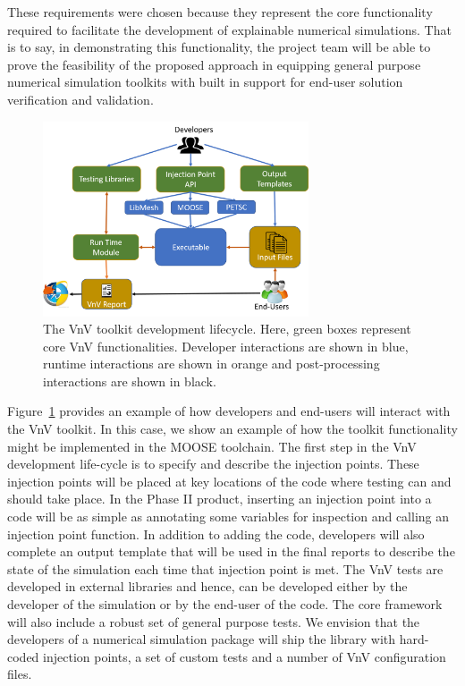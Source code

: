 These requirements were chosen because they represent the core functionality required to facilitate the development of explainable numerical simulations. That is to say, in demonstrating this functionality, the project team will be able to prove the feasibility of the proposed approach in equipping general purpose numerical simulation toolkits with built in support for end-user solution verification and validation. 
\begin{figure}
\centering
 \includegraphics[width=0.7\textwidth]{./Figures/VnVOut.png}
 \caption{ The VnV toolkit development lifecycle. Here, green boxes represent core VnV functionalities. Developer interactions are shown in blue, runtime interactions are shown in orange and post-processing interactions are shown in black. \label{fig:toolchain} } 
\end{figure}
 
Figure~\ref{fig:toolchain} provides an example of how developers and end-users will interact with the VnV toolkit. In this case, we show an example of how the toolkit functionality might be implemented in the MOOSE toolchain. The first step in the VnV development life-cycle is to specify and describe the injection points. These injection points will be placed at key locations of the code where testing can and should take place. In the Phase II product, inserting an injection point into a code will be as simple as annotating some variables for inspection and calling an injection point function. In addition to adding the code, developers will also complete an output template that will be used in the final \VV reports to describe the state of the simulation each time that injection point is met. The VnV tests are developed in external libraries and hence, can be developed either by the developer of the simulation or by the end-user of the code. The core framework will also include a robust set of general purpose \VV tests. We envision that the developers of a numerical simulation package will ship the library with hard-coded injection points, a set of custom \VV tests and a number of VnV configuration files. 


